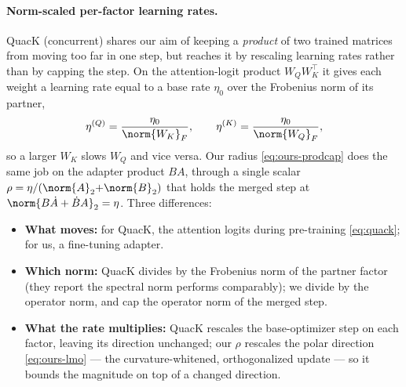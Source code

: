 \paragraph{Norm-scaled per-factor learning rates.} QuacK \cite{quack} (concurrent) shares our aim of keeping a \emph{product} of two trained matrices from moving too far in one step, but reaches it by rescaling learning rates rather than by capping the step. On the attention-logit product $W_QW_K^\top$ it gives each weight a learning rate equal to a base rate $\eta_0$ over the Frobenius norm of its partner,
\begin{equation}
  \eta^{(Q)}=\frac{\eta_0}{\norm{W_K}_F},\qquad
  \eta^{(K)}=\frac{\eta_0}{\norm{W_Q}_F},
  \label{eq:quack}
\end{equation}
so a larger $W_K$ slows $W_Q$ and vice versa. Our radius \eqref{eq:ours-prodcap} does the same job on the adapter product $BA$, through a single scalar $\rho=\eta/(\norm{A}_2{+}\norm{B}_2)$ that holds the merged step at $\norm{B\dot A+\dot B A}_2=\eta$. Three differences:
\begin{itemize}[leftmargin=1.5em,itemsep=1pt,topsep=2pt]
  \item \textbf{What moves:} for QuacK, the attention logits during pre-training \eqref{eq:quack}; for us, a fine-tuning adapter.
  \item \textbf{Which norm:} QuacK divides by the Frobenius norm of the partner factor (they report the spectral norm performs comparably); we divide by the operator norm, and cap the operator norm of the merged step.
  \item \textbf{What the rate multiplies:} QuacK rescales the base-optimizer step on each factor, leaving its direction unchanged; our $\rho$ rescales the polar direction \eqref{eq:ours-lmo} --- the curvature-whitened, orthogonalized update --- so it bounds the magnitude on top of a changed direction.
\end{itemize}

